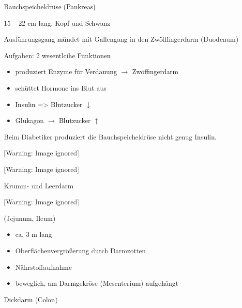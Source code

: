 \documentclass{article}
\begin{document}
Bauchspeicheldr\"use
(Pankreas)

15 -- 22 cm lang, Kopf und Schwanz

Ausf\"uhrungsgang m\"undet mit Gallengang in den Zw\"olffingerdarm
(Duodenum)

Aufgaben: 2 wesentlcihe Funktionen

\begin{itemize}
\item produziert Enzyme f\"ur Verdauung ${\rightarrow}$ Zw\"offingerdarm

\item sch\"uttet Hormone ins Blut aus

\item {}Insulin ={\textgreater} Blutzucker ${\downarrow}$

\item Glukagon ${\rightarrow}$ Blutzucker ${\uparrow}$

\end{itemize}
Beim Diabetiker produziert die Bauchspeicheldr\"use nicht genug Insulin.




\begin{center}
 [Warning: Image ignored] %

\end{center}
\begin{center}
 [Warning: Image ignored] %

\end{center}
Krumm- und Leerdarm 

\begin{center}
 [Warning: Image ignored] %

\end{center}
(Jejunum, Ileum)

\begin{itemize}
\item ca. 3 m lang

\item Oberfl\"achenvergr\"o{\ss}erung durch Darmzotten

\item N\"ahrstoffaufnahme

\item beweglich, am Darmgekr\"ose (Mesenterium) aufgeh\"angt

\end{itemize}
Dickdarm (Colon)
\end{document}
